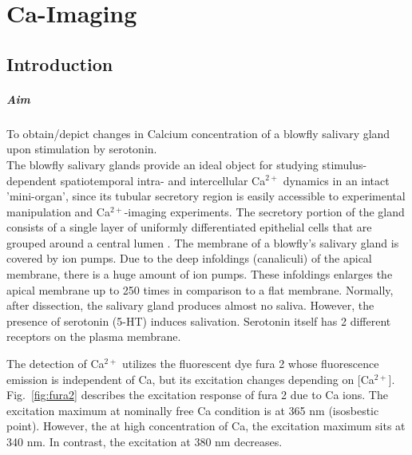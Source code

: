 
\chapter{Ca-Imaging}
\label{chp:Ca-Imaging}


\section{Introduction}

\paragraph{Aim} To obtain/depict changes in Calcium concentration of a blowfly salivary gland upon stimulation by serotonin.
\\

The blowfly salivary glands provide an ideal object for studying stimulus-dependent spatiotemporal intra- and intercellular Ca$^{2+}$ dynamics in an intact 'mini-organ', since its tubular secretory region is easily accessible to experimental manipulation and Ca$^{2+}$-imaging experiments. 
The secretory portion of the gland consists of a single layer of uniformly differentiated epithelial cells that are grouped around a central lumen \cite{Zimmermann1997}.
The membrane of a blowfly's salivary gland is covered by ion pumps. 
Due to the deep infoldings (canaliculi) of the apical membrane, there is a huge amount of ion pumps. These infoldings enlarges the apical membrane up to 250 times in comparison to a flat membrane. 
Normally, after dissection, the salivary gland produces almost no saliva. 
However, the presence of serotonin (5-HT) induces salivation. Serotonin itself has 2 different receptors on the plasma membrane. 

The detection of Ca$^{2+}$ utilizes the fluorescent dye fura 2 whose fluorescence emission is independent of Ca, but its excitation changes depending on [Ca$^{2+}$]. 
Fig.~\ref{fig:fura2} describes the excitation response of fura 2 due to Ca ions. 
The excitation maximum at nominally free Ca condition is at 365 nm (isosbestic point). However, the at high concentration of Ca, the excitation maximum sits at 340 nm. 
In contrast, the excitation at 380 nm decreases. 

